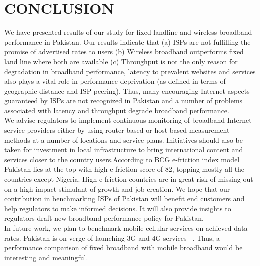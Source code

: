 \documentclass{sig-alternate-10pt}
\begin{document}
\begin{sloppypar}
\section {CONCLUSION}
We have presented results of our study for fixed landline and wireless broadband performance in Pakistan. Our results indicate that (a) ISPs are not fulfilling the promise of advertised rates to users (b) Wireless broadband outperforms fixed land line where both are available (c) Throughput is not the only reason for degradation in broadband performance, latency to prevalent websites and services also plays a vital role in performance deprivation (as defined in terms of geographic distance and ISP peering). Thus, many encouraging Internet aspects guaranteed by ISPs are not recognized in Pakistan and a number of problems associated with latency and throughput degrade broadband performance.\\
\indent We advise regulators to implement continuous monitoring of broadband Internet service providers either by using router based or host based measurement methods at a number of locations and service plans. Initiatives should also be taken for investment in local infrastructure to bring international content and services closer to the country users.According to BCG e-friction index model ~\cite{31} Pakistan lies at the top with high e-friction score of 82, topping mostly all the countries except Nigeria. High e-friction countries are in great risk of missing out on a high-impact stimulant of growth and job creation. We hope that our contribution in benchmarking ISPs of Pakistan will benefit end customers and help regulators to make informed decisions. It will also provide insights to regulators draft new broadband performance policy for Pakistan.\\
\indent In future work, we plan to benchmark mobile cellular services on achieved data rates. Pakistan is on verge of launching 3G and 4G services ~\cite {32,33}.  Thus, a performance comparison of fixed broadband with mobile broadband would be interesting and meaningful.








\begin{small}


\balance 
\end{small}
\end{sloppypar}
\end{document}
